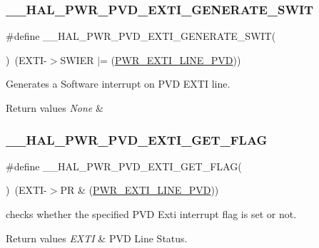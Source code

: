 \subsubsection{\texorpdfstring{\_\_HAL\_PWR\_PVD\_EXTI\_GENERATE\_SWIT}{\_\_HAL\_PWR\_PVD\_EXTI\_GENERATE\_SWIT}}
{\footnotesize\ttfamily \#define \+\_\+\+\_\+\+H\+A\+L\+\_\+\+P\+W\+R\+\_\+\+P\+V\+D\+\_\+\+E\+X\+T\+I\+\_\+\+G\+E\+N\+E\+R\+A\+T\+E\+\_\+\+S\+W\+IT(\begin{DoxyParamCaption}{ }\end{DoxyParamCaption})~(E\+X\+TI-\/$>$S\+W\+I\+ER $\vert$= (\mbox{\hyperlink{group___p_w_r___p_v_d___e_x_t_i___line_ga43a49255649e03d2d2b6b12c5c379d2b}{P\+W\+R\+\_\+\+E\+X\+T\+I\+\_\+\+L\+I\+N\+E\+\_\+\+P\+VD}}))}



Generates a Software interrupt on P\+VD E\+X\+TI line. 


\begin{DoxyRetVals}{Return values}
{\em None} & \\
\hline
\end{DoxyRetVals}
\mbox{\label{group___p_w_r___exported___macro_ga5e66fa75359b51066e0731ac1e5ae438}} 
\subsubsection{\texorpdfstring{\_\_HAL\_PWR\_PVD\_EXTI\_GET\_FLAG}{\_\_HAL\_PWR\_PVD\_EXTI\_GET\_FLAG}}
{\footnotesize\ttfamily \#define \+\_\+\+\_\+\+H\+A\+L\+\_\+\+P\+W\+R\+\_\+\+P\+V\+D\+\_\+\+E\+X\+T\+I\+\_\+\+G\+E\+T\+\_\+\+F\+L\+AG(\begin{DoxyParamCaption}{ }\end{DoxyParamCaption})~(E\+X\+TI-\/$>$PR \& (\mbox{\hyperlink{group___p_w_r___p_v_d___e_x_t_i___line_ga43a49255649e03d2d2b6b12c5c379d2b}{P\+W\+R\+\_\+\+E\+X\+T\+I\+\_\+\+L\+I\+N\+E\+\_\+\+P\+VD}}))}



checks whether the specified P\+VD Exti interrupt flag is set or not. 


\begin{DoxyRetVals}{Return values}
{\em E\+X\+TI} & P\+VD Line Status. \\
\hline
\end{DoxyRetVals}
\mbox{\label{group___p_w_r___exported___macro_ga1ee778f7ff494723bd0ef04ec44b0f77}} 

